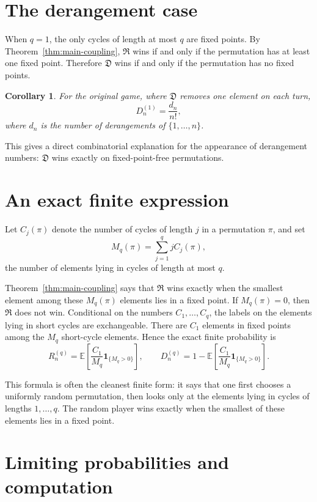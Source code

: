 \documentclass{article}
\newcommand{\Rplayer}{\mathfrak{R}}
\newcommand{\Dplayer}{\mathfrak{D}}
\newtheorem{corollary}{Corollary}
\begin{document}
\section{The derangement case}

When $q=1$, the only cycles of length at most $q$ are fixed points. By
Theorem~\ref{thm:main-coupling}, $\Rplayer$ wins if and only if the
permutation has at least one fixed point. Therefore $\Dplayer$ wins if and
only if the permutation has no fixed points.

\begin{corollary}
For the original game, where $\Dplayer$ removes one element on each turn,
\[
    D_n^{(1)}=\frac{d_n}{n!},
\]
where $d_n$ is the number of derangements of $\{1,\ldots,n\}$.
\end{corollary}

This gives a direct combinatorial explanation for the appearance of
derangement numbers: $\Dplayer$ wins exactly on fixed-point-free
permutations.

\section{An exact finite expression}

Let $C_j(\pi)$ denote the number of cycles of length $j$ in a permutation
$\pi$, and set
\[
    M_q(\pi)=\sum_{j=1}^q jC_j(\pi),
\]
the number of elements lying in cycles of length at most $q$.

Theorem~\ref{thm:main-coupling} says that $\Rplayer$ wins exactly when the
smallest element among these $M_q(\pi)$ elements lies in a fixed point. If
$M_q(\pi)=0$, then $\Rplayer$ does not win. Conditional on the numbers
$C_1,\ldots,C_q$, the labels on the elements lying in short cycles are
exchangeable. There are $C_1$ elements in fixed points among the $M_q$
short-cycle elements. Hence the exact finite probability is
\[
    R_n^{(q)}
    =
    \mathbb{E}\left[
        \frac{C_1}{M_q}\mathbf{1}_{\{M_q>0\}}
    \right],
    \qquad
    D_n^{(q)}
    =
    1-
    \mathbb{E}\left[
        \frac{C_1}{M_q}\mathbf{1}_{\{M_q>0\}}
    \right].
\]

This formula is often the cleanest finite form: it says that one first chooses
a uniformly random permutation, then looks only at the elements lying in cycles
of lengths $1,\ldots,q$. The random player wins exactly when the smallest of
these elements lies in a fixed point.

\section{Limiting probabilities and computation}
\end{document}
